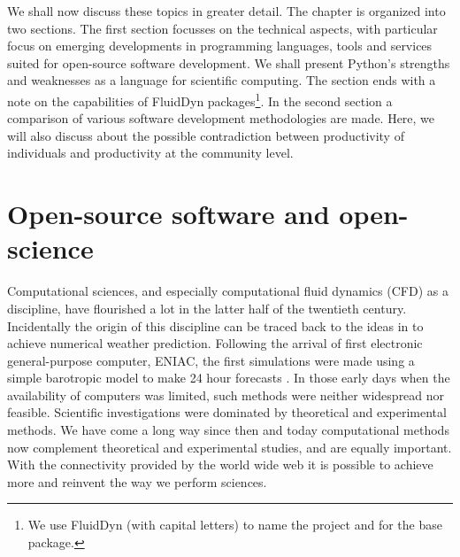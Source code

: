 We shall now discuss these topics in greater detail. The chapter is organized
into two sections. The first section focusses on the technical aspects, with
particular focus on emerging developments in programming languages, tools and
services suited for open-source software development. We shall present Python's
strengths and weaknesses as a language for scientific computing.
%
The section ends with a note on the capabilities of FluidDyn
packages\footnote{We use FluidDyn (with capital letters) to name the project
and \fluiddyn for the base package.}.
%
In the second section a comparison of various software development
methodologies are made. Here, we will also discuss about the possible
contradiction between productivity of individuals and productivity at the
community level.
%

\section{Open-source software and open-science}

Computational sciences, and especially computational fluid dynamics (CFD) as a
discipline, have flourished a lot in the latter half of the twentieth century.
Incidentally the origin of this discipline can be traced back to the ideas in
\citet{richardson_weather_1922} to achieve numerical weather prediction.
Following the arrival of first electronic general-purpose computer, ENIAC, the
first simulations were made using a simple barotropic model to make 24 hour
forecasts \citep{lynch_richardson_2010}. In those early days when the
availability of computers was limited, such methods were neither widespread nor
feasible. Scientific investigations were dominated by theoretical and
experimental methods.
%
We have come a long way since then and today computational methods now
complement theoretical and experimental studies, and are equally important.
%
%
With the connectivity provided by the world wide web it is possible to achieve
more and reinvent the way we perform sciences.

